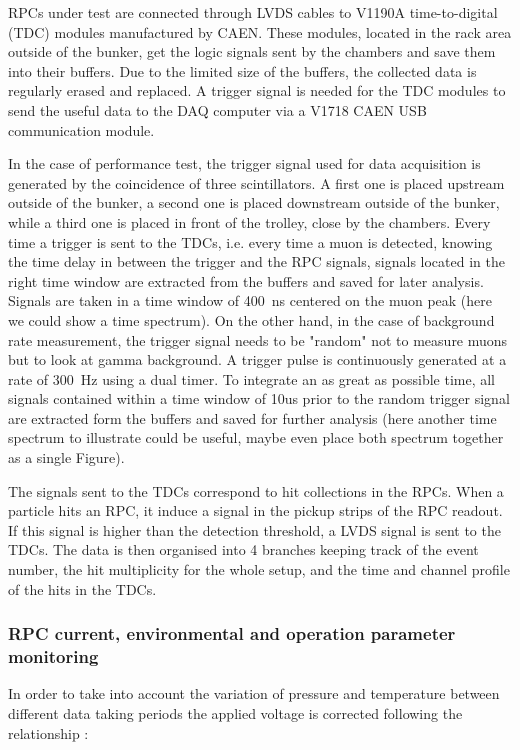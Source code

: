 			RPCs under test are connected through LVDS cables to V1190A time-to-digital (TDC) modules manufactured by CAEN. These modules, located in the rack area outside of the bunker, get the logic signals sent by the chambers and save them into their buffers. Due to the limited size of the buffers, the collected data is regularly erased and replaced. A trigger signal is needed for the TDC modules to send the useful data to the DAQ computer via a V1718 CAEN USB communication module.

			In the case of performance test, the trigger signal used for data acquisition is generated by the coincidence of three scintillators. A first one is placed upstream outside of the bunker, a second one is placed downstream outside of the bunker, while a third one is placed in front of the trolley, close by the chambers. Every time a trigger is sent to the TDCs, i.e. every time a muon is detected, knowing the time delay in between the trigger and the RPC signals, signals located in the right time window are extracted from the buffers and saved for later analysis. Signals are taken in a time window of \SI{400}{ns} centered on the muon peak (here we could show a time spectrum). On the other hand, in the case of background rate measurement, the trigger signal needs to be "random" not to measure muons but to look at gamma background. A trigger pulse is continuously generated at a rate of \SI{300}{Hz} using a dual timer. To integrate an as great as possible time, all signals contained within a time window of 10us prior to the random trigger signal are extracted form the buffers and saved for further analysis (here another time spectrum to illustrate could be useful, maybe even place both spectrum together as a single Figure).

			The signals sent to the TDCs correspond to hit collections in the RPCs. When a particle hits an RPC, it induce a signal in the pickup strips of the RPC readout. If this signal is higher than the detection threshold, a LVDS signal is sent to the TDCs. The data is then organised into 4 branches keeping track of the event number, the hit multiplicity for the whole setup, and the time and channel profile of the hits in the TDCs.

			\subsubsection{RPC current, environmental and operation parameter monitoring}
            
			In order to take into account the variation of pressure and temperature between different data taking periods the applied voltage is corrected following the relationship :

